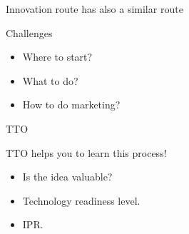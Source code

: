 \documentclass[12pt]{beamer}
\begin{document}
\begin{frame}{Innovation route has also a similar route}
\begin{block}{Challenges}

\begin{itemize}
\item<1-> Where to start?
\item<2-> What to do?
\item<3-> How to do marketing?
\end{itemize}
\end{block}

\end{frame}
\begin{frame}{TTO}
\begin{block}{TTO helps you to learn this process!}
\begin{itemize}
\item<1-> Is the idea valuable?
\item<2-> Technology readiness level.
\item<3-> IPR.
\end{itemize}
\end{block}

\end{frame}
\end{document}
